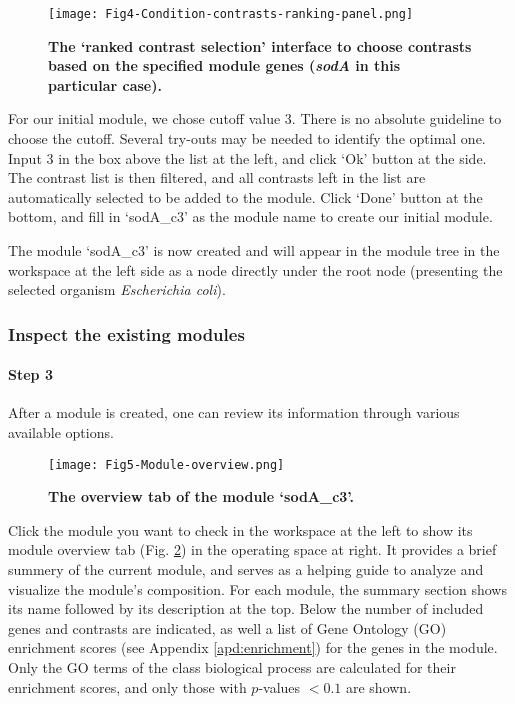 \begin{figure}[tb]
	\centering
  	\texttt{[image: Fig4-Condition-contrasts-ranking-panel.png]}
	\caption[COLOMBOS contrast ranking interface]{\textbf{The `ranked contrast 
	selection' interface to choose contrasts based on the specified module 
	genes (\textit{sodA} in this particular case).}}
	\label{fig:colombos-ranking}
\end{figure}

\begin{adjustwidth}{5mm}{0cm}
For our initial module, we chose cutoff value 3. There is no absolute guideline 
to choose the cutoff. Several try-outs may be needed to identify the optimal 
one. Input 3 in the box above the list at the left, and click `Ok' button at 
the side. The contrast list is then filtered, and all contrasts left in the 
list are automatically selected to be added to the module. Click `Done' button 
at the bottom, and fill in `sodA\_c3' as the module name to create our initial 
module.
\end{adjustwidth}

The module `sodA\_c3' is now created and will appear in the module tree in the 
workspace at the left side as a node directly under the root node (presenting 
the selected organism \textit{Escherichia coli}).



\subsubsection{Inspect the existing modules}

\paragraph{Step 3}
After a module is created, one can review its information through various 
available options.

\begin{figure}[b]
	\centering
  	\texttt{[image: Fig5-Module-overview.png]}
	\caption[`sodA\_c3' module overview]{\textbf{The overview tab of 
	the module `sodA\_c3'.}}
	\label{fig:colombos-init-module}
\end{figure}

\begin{adjustwidth}{5mm}{0cm}
	Click the module you want to check in the workspace 
at the left to show its module overview tab (Fig. 
\ref{fig:colombos-init-module}) in the operating 
space at right. 
It provides a brief summery of the current module, and serves as a 
helping guide to analyze and visualize the module's composition. For each 
module, the summary section shows its name followed by its description at the 
top. Below the number of included genes and contrasts are indicated, as well a 
list of Gene Ontology (GO) enrichment scores (see Appendix 
\ref{apd:enrichment}) for the 
genes in the module. Only the GO terms of the class biological process are 
calculated for their enrichment scores, and only those with $p$-values $< 0.1$ 
are shown. 
\end{adjustwidth}

